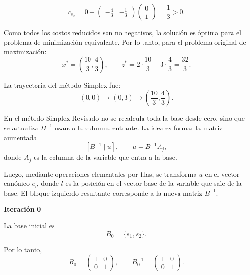 \begin{enumerate}
\begin{equation}
\bar{c}_{s_2}
=
0-
\begin{pmatrix}
-\frac{4}{3} & -\frac{1}{3}
\end{pmatrix}
\begin{pmatrix}
0\\
1
\end{pmatrix}
=
\frac{1}{3}>0.
\end{equation}

Como todos los costos reducidos son no negativos, la solución es óptima para el problema de minimización equivalente. Por lo tanto, para el problema original de maximización:
\begin{equation}
x^*
=
\left(
\frac{10}{3},
\frac{4}{3}
\right),
\qquad
z^*
=
2\cdot \frac{10}{3}
+
3\cdot \frac{4}{3}
=
\frac{32}{3}.
\end{equation}

La trayectoria del método Simplex fue:
\begin{equation}
(0,0)
\longrightarrow
(0,3)
\longrightarrow
\left(\frac{10}{3},\frac{4}{3}\right).
\end{equation}

En el método Simplex Revisado no se recalcula toda la base desde cero,
sino que se actualiza $B^{-1}$ usando la columna entrante. La idea es formar
la matriz aumentada
\begin{equation}
\left[B^{-1}\mid u\right],
\qquad
u=B^{-1}A_j,
\end{equation}
donde $A_j$ es la columna de la variable que entra a la base.

Luego, mediante operaciones elementales por filas, se transforma $u$ en el
vector canónico $e_l$, donde $l$ es la posición en el vector base de la variable que sale de la base. El bloque izquierdo
resultante corresponde a la nueva matriz $B^{-1}$.

\textbf{Iteración 0}

La base inicial es
\begin{equation}
B_0=\{s_1,s_2\}.
\end{equation}

Por lo tanto,
\begin{equation}
B_0=
\begin{pmatrix}
1 & 0\\
0 & 1
\end{pmatrix},
\qquad
B_0^{-1}=
\begin{pmatrix}
1 & 0\\
0 & 1
\end{pmatrix}.
\end{equation}


\end{enumerate}
